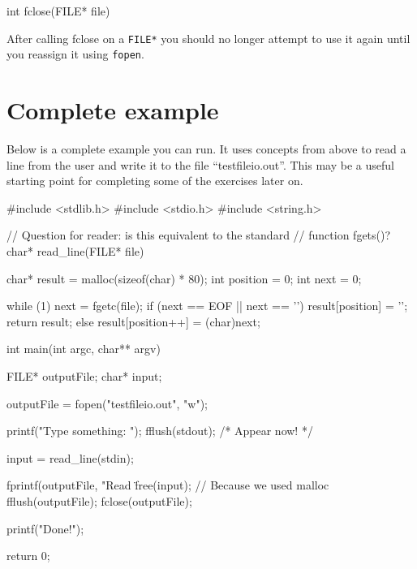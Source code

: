 \begin{codeinline}
int fclose(FILE* file)
\end{codeinline}

After calling fclose on a \texttt{FILE*} you should no longer attempt to use it again until you reassign it using \texttt{fopen}.

\section{Complete example}

Below is a complete example you can run. 
It uses concepts from above to read a line from the user and write it to the file ``testfileio.out''.
This may be a useful starting point for completing some of the exercises later on.

\begin{codeblock}
#include <stdlib.h>
#include <stdio.h>
#include <string.h>

// Question for reader: is this equivalent to the standard
// function fgets()?
char* read_line(FILE* file)
{
    char* result = malloc(sizeof(char) * 80);
    int position = 0;
    int next = 0;

    while (1) {
        next = fgetc(file);
        if (next == EOF || next == '\n') {
            result[position] = '\0';
            return result;
        } else {
            result[position++] = (char)next;
        }
    }
}

int main(int argc, char** argv)
{
    FILE* outputFile;
    char* input;

    outputFile = fopen("testfileio.out", "w");

    printf("Type something: ");
    fflush(stdout); /* Appear now! */

    input = read_line(stdin);

    fprintf(outputFile, "Read \"%
    free(input); // Because we used malloc
    fflush(outputFile);
    fclose(outputFile);

    printf("Done!\n");

    return 0;
}
\end{codeblock}

